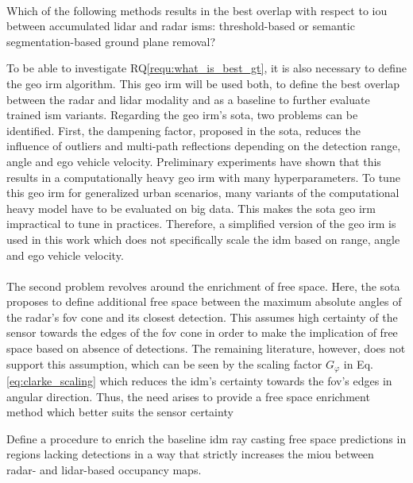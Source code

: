 \\
\begin{requ} \label{requ:what_is_best_gt}
	Which of the following methods results in the best overlap with respect to \gls{iou} between accumulated lidar and radar \gls{ism}s: threshold-based or semantic segmentation-based ground plane removal?
\end{requ}
To be able to investigate RQ\ref{requ:what_is_best_gt}, it is also necessary to define the geo \gls{irm} algorithm. This geo \gls{irm} will be used both, to define the best overlap between the radar and lidar modality and as a baseline to further evaluate trained \gls{ism} variants. Regarding the geo \gls{irm}'s \gls{sota}, two problems can be identified. First, the dampening factor, proposed in the \gls{sota}, reduces the influence of outliers and multi-path reflections depending on the detection range, angle and ego vehicle velocity. Preliminary experiments have shown that this results in a computationally heavy geo \gls{irm} with many hyperparameters. To tune this geo \gls{irm} for generalized urban scenarios, many variants of the computational heavy model have to be evaluated on big data. This makes the \gls{sota} geo \gls{irm} impractical to tune in practices. Therefore, a simplified version of the geo \gls{irm} is used in this work which does not specifically scale the \gls{idm} based on range, angle and ego vehicle velocity.
\\\\
The second problem revolves around the enrichment of free space. Here, the \gls{sota} proposes to define additional free space between the maximum absolute angles of the radar's \gls{fov} cone and its closest detection. This assumes high certainty of the sensor towards the edges of the \gls{fov} cone in order to make the implication of free space based on absence of detections. The remaining literature, however, does not support this assumption, which can be seen by the scaling factor $G_\varphi$ in Eq. \ref{eq:clarke_scaling} which reduces the \gls{idm}'s certainty towards the \gls{fov}'s edges in angular direction. Thus, the need arises to provide a free space enrichment method which better suits the sensor certainty
\\
\begin{requ} \label{requ:fr_space_enrichment}
	Define a procedure to enrich the baseline \gls{idm} ray casting free space predictions in regions lacking detections in a way that strictly increases the m\gls{iou} between radar- and lidar-based occupancy maps.
\end{requ}
%
